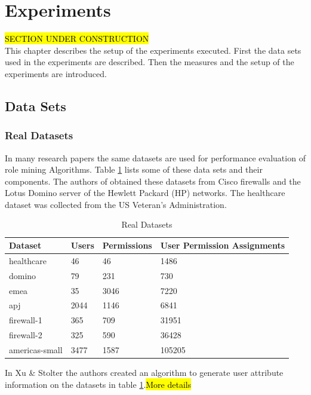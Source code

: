 \newpage
\section{Experiments}
\hl{SECTION UNDER CONSTRUCTION}\\
This chapter describes the setup of the experiments executed. First the data sets used in the experiments are described. Then the measures and the setup of the experiments are introduced.

\subsection{Data Sets}
\subsubsection{Real Datasets}
In many research papers the same datasets are used for performance evaluation of role mining Algorithms. Table \ref{tab:realDatasets} lists some of these data sets and their components. The authors of \cite{Ene} obtained these datasets from Cisco firewalls and the Lotus Domino server of the Hewlett Packard (HP) networks. The healthcare dataset was collected from the US Veteran’s Administration.
\begin{table}
    \centering
    \begin{tabular}{|l|l|l|l|}
        \hline
        \rowcolor{myGray} 
        \textbf{Dataset} & \textbf{Users} & \textbf{Permissions} & \textbf{User Permission Assignments} \\ \hline
        healthcare       & 46             & 46                   & 1486                                 \\ \hline
        domino           & 79             & 231                  & 730                                  \\ \hline
        emea             & 35             & 3046                 & 7220                                 \\ \hline
        apj              & 2044           & 1146                 & 6841                                 \\ \hline
        firewall-1       & 365            & 709                  & 31951                                \\ \hline
        firewall-2       & 325            & 590                  & 36428                                \\ \hline
        americas-small   & 3477           & 1587                 & 105205                               \\ \hline
    \end{tabular}
    \caption{Real Datasets}
    \label{tab:realDatasets}
\end{table}
In Xu \& Stolter\cite{Xu} the authors created an algorithm to generate user attribute information on the datasets in table \ref{tab:realDatasets}.\hl{More details}


